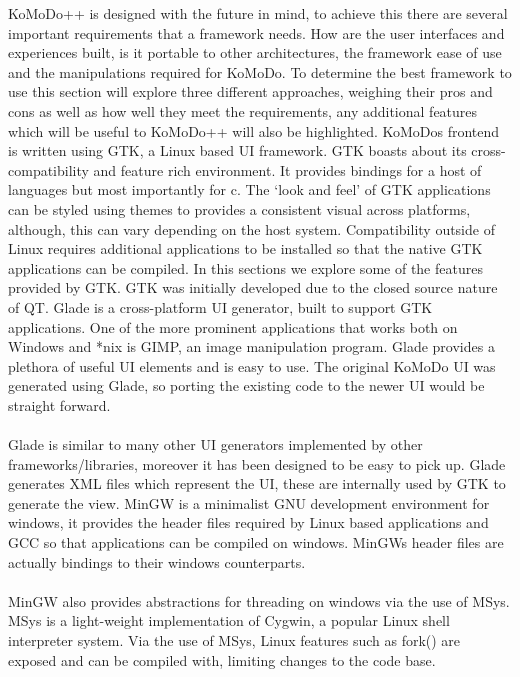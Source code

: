 %
KoMoDo++ is designed with the future in mind, to achieve this there are several important requirements that a framework needs. How are the user interfaces and experiences built, is it portable to other architectures, the framework ease of use and the manipulations required for KoMoDo. To determine the best framework to use this section will explore three different approaches, weighing their pros and cons as well as how well they meet the requirements, any additional features which will be useful to KoMoDo++ will also be highlighted.
%
KoMoDos frontend is written using GTK, a Linux based UI framework. GTK boasts about its cross-compatibility and feature rich environment. It provides bindings for a host of languages but most importantly for c. The  `look and feel' of GTK applications can be styled using themes to provides a consistent visual across platforms, although, this can vary depending on the host system. Compatibility outside of Linux requires additional applications to be installed so that the native GTK applications can be compiled. In this sections we explore some of the features provided by GTK. GTK was initially developed due to the closed source nature of QT.
  Glade is a cross-platform UI generator, built to support GTK applications. One of the more prominent applications that works both on Windows and *nix is GIMP, an image manipulation program. Glade provides a plethora of useful UI elements and is easy to use. The original KoMoDo UI was generated using Glade, so porting the existing code to the newer UI would be straight forward.\\\\
  Glade is similar to many other UI generators implemented by other frameworks/libraries, moreover it has been designed to be easy to pick up. Glade generates XML files which represent the UI, these are internally used by GTK to generate the view.
  MinGW is a minimalist GNU development environment for windows, it provides the header files required by Linux based applications and GCC so that applications can be compiled on windows. MinGWs header files are actually bindings to their windows counterparts.\\\\
  MinGW also provides abstractions for threading on windows via the use of MSys. MSys is a light-weight implementation of Cygwin, a popular Linux shell interpreter system. Via the use of MSys, Linux features such as fork() are exposed and can be compiled with, limiting changes to the code base.
